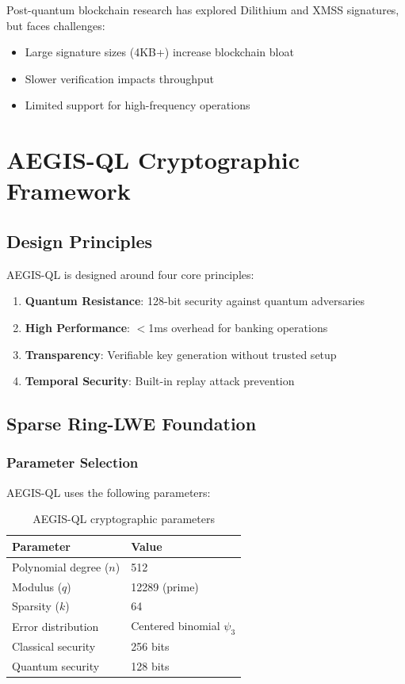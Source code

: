 \documentclass[11pt,a4paper]{article}
\begin{document}
Post-quantum blockchain research \cite{qrl2018,quantum2021} has explored Dilithium and XMSS signatures, but faces challenges:
\begin{itemize}
    \item Large signature sizes (4KB+) increase blockchain bloat
    \item Slower verification impacts throughput
    \item Limited support for high-frequency operations
\end{itemize}

\section{AEGIS-QL Cryptographic Framework}

\subsection{Design Principles}

AEGIS-QL is designed around four core principles:

\begin{enumerate}[leftmargin=*]
    \item \textbf{Quantum Resistance}: 128-bit security against quantum adversaries
    \item \textbf{High Performance}: $<$1ms overhead for banking operations
    \item \textbf{Transparency}: Verifiable key generation without trusted setup
    \item \textbf{Temporal Security}: Built-in replay attack prevention
\end{enumerate}

\subsection{Sparse Ring-LWE Foundation}

\subsubsection{Parameter Selection}

AEGIS-QL uses the following parameters:

\begin{table}[h]
\centering
\begin{tabular}{@{}ll@{}}
\toprule
\textbf{Parameter} & \textbf{Value} \\ \midrule
Polynomial degree ($n$) & 512 \\
Modulus ($q$) & 12289 (prime) \\
Sparsity ($k$) & 64 \\
Error distribution & Centered binomial $\psi_3$ \\
Classical security & 256 bits \\
Quantum security & 128 bits \\ \bottomrule
\end{tabular}
\caption{AEGIS-QL cryptographic parameters}
\label{tab:aegis_params}
\end{table}
\end{document}
